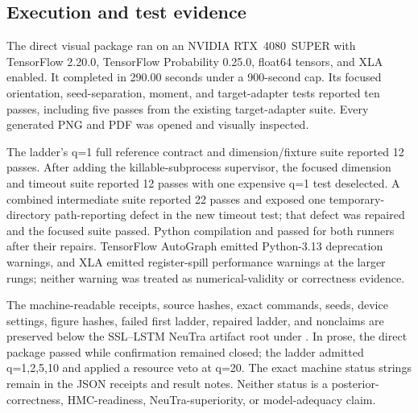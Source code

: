 \subsection{Execution and test evidence}
\label{subsec:bf-ssl-lstm-direct-test-evidence}

The direct visual package ran on an NVIDIA RTX~4080~SUPER with TensorFlow
2.20.0, TensorFlow Probability 0.25.0, float64 tensors, and XLA enabled.  It
completed in 290.00 seconds under a 900-second cap.  Its focused orientation,
seed-separation, moment, and target-adapter tests reported ten passes, including
five passes from the existing target-adapter suite.  Every generated PNG and
PDF was opened and visually inspected.

The ladder's q=1 full reference contract and dimension/fixture suite reported
12 passes.  After adding the killable-subprocess supervisor, the focused
dimension and timeout suite reported 12 passes with one expensive q=1 test
deselected.  A combined intermediate suite reported 22 passes and exposed one
temporary-directory path-reporting defect in the new timeout test; that defect
was repaired and the focused suite passed.  Python compilation and
 passed for both runners after their repairs.
TensorFlow AutoGraph emitted Python-3.13 deprecation warnings, and XLA emitted
register-spill performance warnings at the larger rungs; neither warning was
treated as numerical-validity or correctness evidence.

The machine-readable receipts, source hashes, exact commands, seeds, device
settings, figure hashes, failed first ladder, repaired ladder, and nonclaims
are preserved below the SSL--LSTM NeuTra artifact root under
.  In prose, the direct package passed while
confirmation remained closed; the ladder admitted q=1,2,5,10 and applied a
resource veto at q=20.  The exact machine status strings remain in the JSON
receipts and result notes.  Neither status is a posterior-correctness,
HMC-readiness, NeuTra-superiority, or model-adequacy claim.

\FloatBarrier
